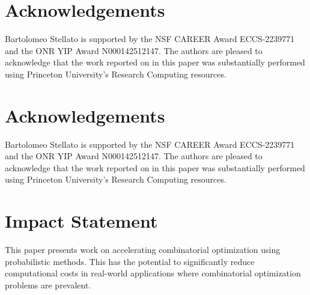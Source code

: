 \documentclass[12pt]{article}
\theoremstyle{definition}
\theoremstyle{remark}
\def\isaccepted{}
\theoremstyle{plain}
\theoremstyle{definition}
\theoremstyle{remark}
\begin{document}


\newcommand{\myack}{%
Bartolomeo Stellato is supported by the NSF CAREER Award ECCS-2239771 and the ONR YIP Award N000142512147.
The authors are pleased to acknowledge that the work reported on in this paper was substantially performed using Princeton University's Research Computing resources.%
}

\ifarxiv
\section*{Acknowledgements}
\myack



\else
\balance
\ifdefined\isaccepted
\section*{Acknowledgements}
\myack
\fi

\section*{Impact Statement}
This paper presents work on accelerating combinatorial optimization using probabilistic methods.
This has the potential to significantly reduce computational costs in real-world applications where combinatorial optimization problems are prevalent.



\fi
\end{document}

